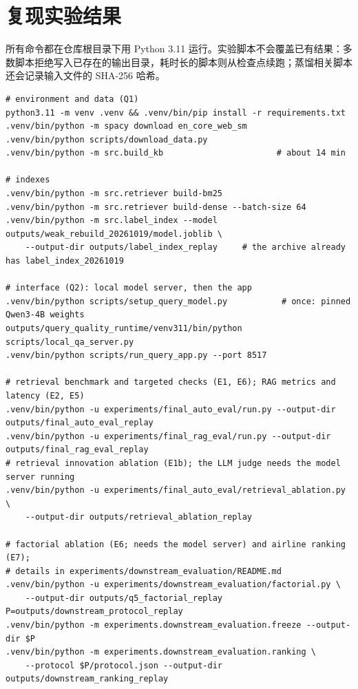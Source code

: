 \documentclass[10pt,twocolumn,a4paper]{article}
\begin{document}
\printbibliography

\appendix
\onecolumn
\section{复现实验结果}
\label{app:repro}

所有命令都在仓库根目录下用 Python 3.11 运行。实验脚本不会覆盖已有结果：多数脚本拒绝写入已存在的输出目录，耗时长的脚本则从检查点续跑；蒸馏相关脚本还会记录输入文件的 SHA-256 哈希。

\begin{Verbatim}[fontsize=\footnotesize, frame=single, framesep=3mm, rulecolor=\color{black!25}]
# environment and data (Q1)
python3.11 -m venv .venv && .venv/bin/pip install -r requirements.txt
.venv/bin/python -m spacy download en_core_web_sm
.venv/bin/python scripts/download_data.py
.venv/bin/python -m src.build_kb                       # about 14 min

# indexes
.venv/bin/python -m src.retriever build-bm25
.venv/bin/python -m src.retriever build-dense --batch-size 64
.venv/bin/python -m src.label_index --model outputs/weak_rebuild_20261019/model.joblib \
    --output-dir outputs/label_index_replay     # the archive already has label_index_20261019

# interface (Q2): local model server, then the app
.venv/bin/python scripts/setup_query_model.py           # once: pinned Qwen3-4B weights
outputs/query_quality_runtime/venv311/bin/python scripts/local_qa_server.py
.venv/bin/python scripts/run_query_app.py --port 8517

# retrieval benchmark and targeted checks (E1, E6); RAG metrics and latency (E2, E5)
.venv/bin/python -u experiments/final_auto_eval/run.py --output-dir outputs/final_auto_eval_replay
.venv/bin/python -u experiments/final_rag_eval/run.py --output-dir outputs/final_rag_eval_replay
# retrieval innovation ablation (E1b); the LLM judge needs the model server running
.venv/bin/python -u experiments/final_auto_eval/retrieval_ablation.py \
    --output-dir outputs/retrieval_ablation_replay

# factorial ablation (E6; needs the model server) and airline ranking (E7);
# details in experiments/downstream_evaluation/README.md
.venv/bin/python -u experiments/downstream_evaluation/factorial.py \
    --output-dir outputs/q5_factorial_replay
P=outputs/downstream_protocol_replay
.venv/bin/python -m experiments.downstream_evaluation.freeze --output-dir $P
.venv/bin/python -m experiments.downstream_evaluation.ranking \
    --protocol $P/protocol.json --output-dir outputs/downstream_ranking_replay


\end{Verbatim}
\end{document}
